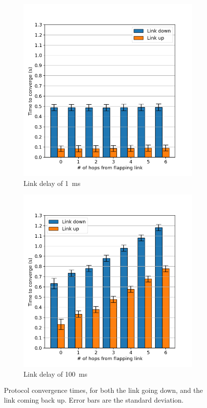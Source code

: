 \documentclass[withindex,glossary,openany]{cam-thesis}
\begin{document}
\begin{figure}
\centering
\begin{subfigure}{.5\textwidth}
  \centering
  \includegraphics[width=1\linewidth]{conv_1ms}
  \caption{Link delay of \SI{1}{\ms}}
  \label{fig:conv_1ms}
\end{subfigure}%
\begin{subfigure}{.5\textwidth}
  \centering
  \includegraphics[width=1\linewidth]{conv_100ms}
  \caption{Link delay of \SI{100}{\ms}}
  \label{fig:conv_100ms}
\end{subfigure}
\caption{Protocol convergence times, for both the link going down, and the link coming back up. Error bars are the standard deviation.}
\label{fig:conv}
\end{figure}
\end{document}
